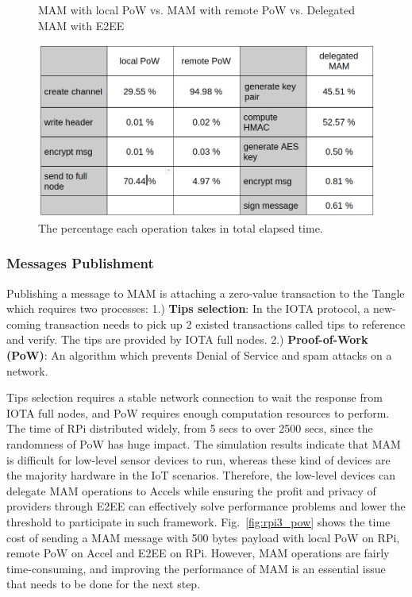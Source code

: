 \documentclass[conference]{IEEEtran}
\begin{document}
\begin{figure}[!htb]
  \caption{MAM with local PoW \newline vs. MAM with remote PoW \newline vs. Delegated MAM with E2EE}\label{fig:rpi3_pow}  
\endminipage\hfill
{}%
  \includegraphics[width=\linewidth]{op_share}
  \caption{The percentage each operation takes in total elapsed time.}\label{fig:op_share}  
\endminipage
\end{figure}

\subsubsection{Messages Publishment}
Publishing a message to MAM is attaching a zero-value transaction to the Tangle which requires two processes: 1.) \textbf{Tips selection}: In the IOTA protocol, a new-coming transaction needs to pick up 2 existed transactions called tips to reference and verify. The tips are provided by IOTA full nodes. 2.) \textbf{Proof-of-Work (PoW)}: An algorithm which prevents Denial of Service and spam attacks on a network.

Tips selection requires a stable network connection to wait the response from IOTA full nodes, and PoW requires enough computation resources to perform. The time of RPi distributed widely, from 5 secs to over 2500 secs, since the randomness of PoW has huge impact. The simulation results indicate that MAM is difficult for low-level sensor devices to run, whereas these kind of devices are the majority hardware in the IoT scenarios. Therefore, the low-level devices can delegate MAM operations to Accels while ensuring the profit and privacy of providers through E2EE can effectively solve performance problems and lower the threshold to participate in such framework. Fig.~\ref{fig:rpi3_pow} shows the time cost of sending a MAM message with 500 bytes payload with local PoW on RPi, remote PoW on Accel and E2EE on RPi. However, MAM operations are fairly time-consuming, and improving the performance of MAM is an essential issue that needs to be done for the next step.
\end{document}
